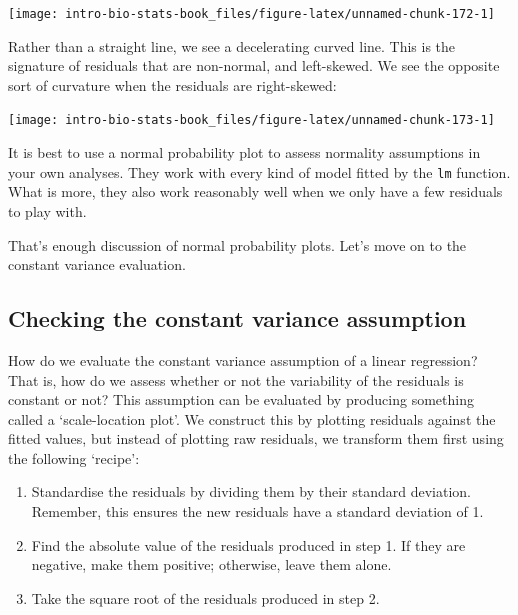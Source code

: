 \documentclass[
]{book}
\begin{document}
\begin{center}\texttt{[image: intro-bio-stats-book\_files/figure-latex/unnamed-chunk-172-1]} \end{center}

Rather than a straight line, we see a decelerating curved line. This is the signature of residuals that are non-normal, and left-skewed. We see the opposite sort of curvature when the residuals are right-skewed:

\begin{center}\texttt{[image: intro-bio-stats-book\_files/figure-latex/unnamed-chunk-173-1]} \end{center}

It is best to use a normal probability plot to assess normality assumptions in your own analyses. They work with every kind of model fitted by the \texttt{lm} function. What is more, they also work reasonably well when we only have a few residuals to play with.

That's enough discussion of normal probability plots. Let's move on to the constant variance evaluation.

\hypertarget{checking-the-constant-variance-assumption}{%
\subsection{Checking the constant variance assumption}\label{checking-the-constant-variance-assumption}}

How do we evaluate the constant variance assumption of a linear regression? That is, how do we assess whether or not the variability of the residuals is constant or not? This assumption can be evaluated by producing something called a `scale-location plot'. We construct this by plotting residuals against the fitted values, but instead of plotting raw residuals, we transform them first using the following `recipe':

\begin{enumerate}
\def\labelenumi{\arabic{enumi}.}
\item
  Standardise the residuals by dividing them by their standard deviation. Remember, this ensures the new residuals have a standard deviation of 1.
\item
  Find the absolute value of the residuals produced in step 1. If they are negative, make them positive; otherwise, leave them alone.
\item
  Take the square root of the residuals produced in step 2.
\end{enumerate}
\end{document}
